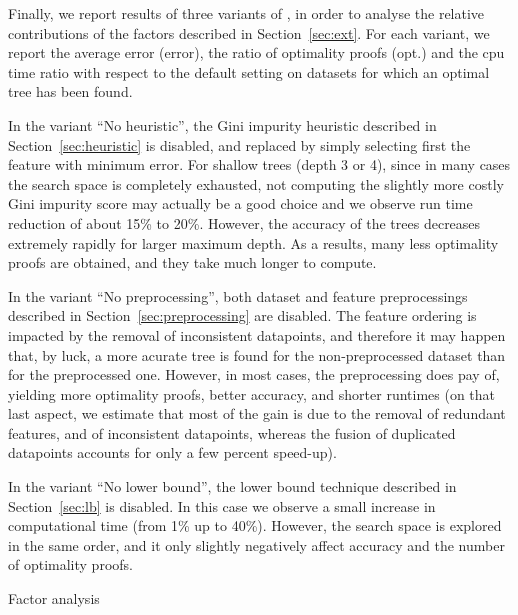 \documentclass{llncs}
\begin{document}
Finally, we report results of three variants of \budalg, in order to analyse the relative contributions of the factors described in Section~\ref{sec:ext}. For each variant, we report the average error (error), the ratio of optimality proofs (opt.) and the cpu time ratio with respect to the default setting on datasets for which an optimal tree has been found.

In the variant ``No heuristic'', the Gini impurity heuristic described in Section~\ref{sec:heuristic} is disabled, and replaced by simply selecting first the feature with minimum error. For shallow trees (depth 3 or 4), since in many cases the search space is completely exhausted, not computing the slightly more costly Gini impurity score may actually be a good choice and we observe run time reduction of about 15\% to 20\%. However, the accuracy of the trees decreases extremely rapidly for larger maximum depth. As a results, many less optimality proofs are obtained, and they take much longer to compute.

In the variant ``No preprocessing'', both dataset and feature preprocessings described in Section~\ref{sec:preprocessing} are disabled. The feature ordering is impacted by the removal of inconsistent datapoints, and therefore it may happen that, by luck, a more acurate tree is found for the non-preprocessed dataset than for the preprocessed one. However, in most cases, the preprocessing does pay of, yielding more optimality proofs, better accuracy, and shorter runtimes (on that last aspect, we estimate that most of the gain is due to the removal of redundant features, and of inconsistent datapoints, whereas the fusion of duplicated datapoints accounts for only a few percent speed-up).

In the variant ``No lower bound'', the lower bound technique described in Section~\ref{sec:lb} is disabled. In this case we observe a small increase in computational time (from 1\% up to 40\%). However, the search space is explored in the same order, and it only slightly negatively affect accuracy and the number of optimality proofs.

\begin{table}[htbp]
\begin{center}
\begin{footnotesize}
\tabcolsep=2pt

\end{footnotesize}
\end{center}
\caption{\label{tab:factor} Factor analysis}
\end{table}
\end{document}

